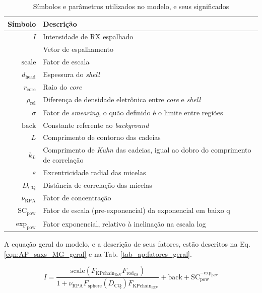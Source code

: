 \begin{apendicesenv}
\begin{table}
    \IBGEtab%
    {\caption{Símbolos e parâmetros utilizados no modelo, e seus significados}
     \label{tab_ap:simbolos} }%
    {\begin{tabular}{r p{8cm}}
    	\toprule
     Símbolo 			    & Descrição        						\\    \midrule
     \(I\)					& Intensidade de RX espalhado			\\
     \q					    & Vetor de espalhamento					\\    \midrule
     \(\mathrm{scale}\)				& Fator de escala						\\
     \(d_{\mathrm{head}}\)			& Espessura do \emph{shell}				\\
     \(r_{\mathrm{core}}\)			& Raio do \emph{core}					\\
     \(\rho_{\mathrm{rel}}\)		    & Diferença de densidade eletrônica entre \emph{core} e \emph{shell} \\
     \(\sigma\)			    & Fator de \emph{smearing}, o quão definido é o limite entre regiões \\
     \(\mathrm{back}\)				& Constante referente ao \emph{background} \\
     \(L\)					& Comprimento de contorno das cadeias 	\\
     \(k_L\)				& Comprimento de \emph{Kuhn} das cadeias, igual ao dobro do comprimento de correlação \\ %
     \(\varepsilon\)		& Excentricidade radial das micelas		\\
     \(D_{\mathrm{CQ}}\)			    & Distância de correlação das micelas 	\\
     \(\nu_{\mathrm{RPA}}\)			& Fator de concentração					\\ \midrule
     \(\mathrm{SC}_{\mathrm{pow}}\)			& Fator de escala (pre-exponencial) da exponencial em baixo q\\
     \(\mathrm{exp}_{\mathrm{pow}}\)			& Fator exponencial, relativo à inclinação na escala log\\ \bottomrule
    \end{tabular}}%
    {}%
\end{table}

A equação geral do modelo, e a descrição de seus fatores, estão descritos na Eq.\ref{eqn:AP_saxs_MG_geral} e na Tab. \ref{tab_ap:fatores_geral}.

\begin{equation}
I = \frac{\mathrm{scale}\left(F_{\mathrm{KPchain}_{\mathrm{ExV}}}F_{\mathrm{rod}_{\mathrm{CS}}}\right)}{1 + \nu_{\mathrm{RPA}} F_{\mathrm{sphere}}\left( D_{\mathrm{CQ}}\right) F_{\mathrm{KPchain}_{\mathrm{ExV}}}} + \mathrm{back} + \mathrm{SC}_{\mathrm{pow}}^{-\mathrm{exp}_{\mathrm{pow}}}
\label{eqn:AP_saxs_MG_geral}
\end{equation}


\end{apendicesenv}
